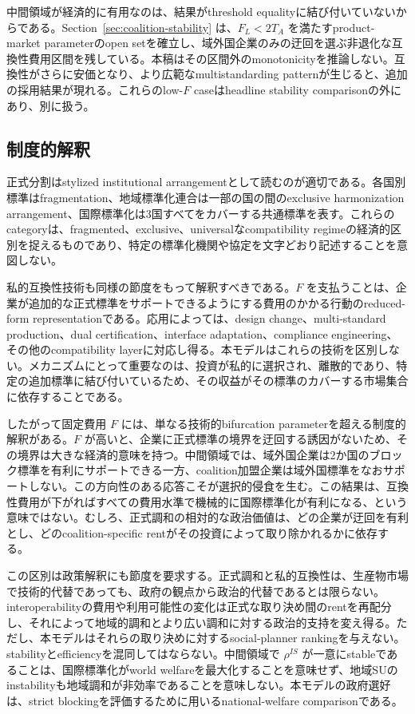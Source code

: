 中間領域が経済的に有用なのは、結果がthreshold equalityに結び付いていないからである。Section~\ref{sec:coalition-stability} は、$F_L<2T_A$ を満たすproduct-market parameterのopen setを確立し、域外国企業のみの迂回を選ぶ非退化な互換性費用区間を残している。本稿はその区間外のmonotonicityを推論しない。互換性がさらに安価となり、より広範なmultistandarding patternが生じると、追加の採用結果が現れる。これらのlow-$F$ caseはheadline stability comparisonの外にあり、別に扱う。

\subsection{制度的解釈}
\label{subsec:discussion-institutions}

正式分割はstylized institutional arrangementとして読むのが適切である。各国別標準はfragmentation、地域標準化連合は一部の国の間のexclusive harmonization arrangement、国際標準化は3国すべてをカバーする共通標準を表す。これらのcategoryは、fragmented、exclusive、universalなcompatibility regimeの経済的区別を捉えるものであり、特定の標準化機関や協定を文字どおり記述することを意図しない。

私的互換性技術も同様の節度をもって解釈すべきである。$F$ を支払うことは、企業が追加的な正式標準をサポートできるようにする費用のかかる行動のreduced-form representationである。応用によっては、design change、multi-standard production、dual certification、interface adaptation、compliance engineering、その他のcompatibility layerに対応し得る。本モデルはこれらの技術を区別しない。メカニズムにとって重要なのは、投資が私的に選択され、離散的であり、特定の追加標準に結び付いているため、その収益がその標準のカバーする市場集合に依存することである。

したがって固定費用 $F$ には、単なる技術的bifurcation parameterを超える制度的解釈がある。$F$ が高いと、企業に正式標準の境界を迂回する誘因がないため、その境界は大きな経済的意味を持つ。中間領域では、域外国企業は2か国のブロック標準を有利にサポートできる一方、coalition加盟企業は域外国標準をなおサポートしない。この方向性のある応答こそが選択的侵食を生む。この結果は、互換性費用が下がればすべての費用水準で機械的に国際標準化が有利になる、という意味ではない。むしろ、正式調和の相対的な政治価値は、どの企業が迂回を有利とし、どのcoalition-specific rentがその投資によって取り除かれるかに依存する。

この区別は政策解釈にも節度を要求する。正式調和と私的互換性は、生産物市場で技術的代替であっても、政府の観点から政治的代替であるとは限らない。interoperabilityの費用や利用可能性の変化は正式な取り決め間のrentを再配分し、それによって地域的調和とより広い調和に対する政治的支持を変え得る。ただし、本モデルはそれらの取り決めに対するsocial-planner rankingを与えない。stabilityとefficiencyを混同してはならない。中間領域で $\rho^{IS}$ が一意にstableであることは、国際標準化がworld welfareを最大化することを意味せず、地域SUのinstabilityも地域調和が非効率であることを意味しない。本モデルの政府選好は、strict blockingを評価するために用いるnational-welfare comparisonである。

